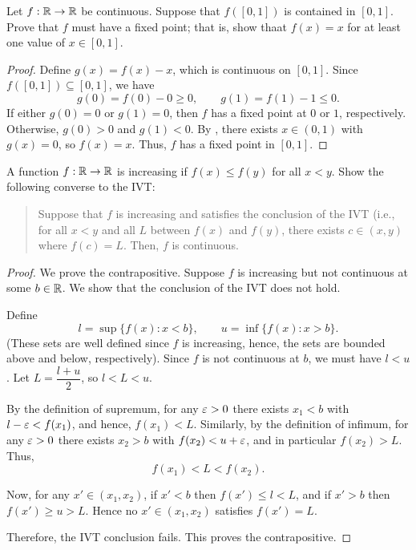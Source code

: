 \begin{problem}
  Let $f : \mathbb{R} \to \mathbb{R}$ be continuous. Suppose that $f([0, 1])$ is contained in $[0, 1]$. Prove that 
  $f$ must have a fixed point; that is, show thaat $f(x) = x$ for at least one value of $x \in [0, 1]$.

  \begin{proof}
    Define $g(x) = f(x) - x$, which is continuous on $[0,1]$.
    Since $f([0,1]) \subseteq [0,1]$, we have
    \[
      g(0) = f(0) - 0 \geq 0, \qquad g(1) = f(1) - 1 \leq 0.
    \]
    If either $g(0) = 0$ or $g(1) = 0$, then $f$ has a fixed point at $0$ or $1$, respectively.
    Otherwise, $g(0) > 0$ and $g(1) < 0$. By ,
    there exists $x \in (0,1)$ with $g(x) = 0$, so $f(x) = x$.
    Thus, $f$ has a fixed point in $[0,1]$.
  \end{proof}
\end{problem}

\begin{problem}
  A function $f : \mathbb{R} \to \mathbb{R}$ is increasing if $f(x) \leq f(y)$ for all $x < y$. Show the following converse to the IVT:

  \begin{quote}
    Suppose that $f$ is increasing and satisfies the conclusion of the IVT
    (i.e., for all $x < y$ and all $L$ between $f(x)$ and $f(y)$, there exists
    $c \in (x, y)$ where $f(c) = L$. Then, $f$ is continuous.
  \end{quote}

  \begin{proof}
    We prove the contrapositive. Suppose $f$ is increasing but not continuous
    at some $b \in \mathbb{R}$. We show that the conclusion of the IVT does not hold.

    Define
    \[
      l = \sup \{ f(x) : x < b \}, \qquad u = \inf \{ f(x) : x > b \}.
    \]
    (These sets are well defined since $f$ is increasing, hence, the sets are
    bounded above and below, respectively).
    Since $f$ is not continuous at $b$, we must have $l<u$.
    Let $L = \dfrac{l+u}{2}$, so $l < L < u$.

    By the definition of supremum, for any $\varepsilon > 0$ there exists
    $x_{1} < b$ with $l - \varepsilon < f(x_{1})$, and hence, $f(x_{1}) < L$.
    Similarly, by the definition of infimum, for any $\varepsilon > 0$ there
    exists $x_{2} > b$ with $f(x_{2}) < u + \varepsilon$, and in particular $f(x_{2})>L$. 
    Thus,
    \[
      f(x_{1}) < L < f(x_{2}).
    \]

    Now, for any $x'\in(x_{1},x_{2})$, if $x' < b$ then $f(x') \leq l < L$, and if
    $x' > b$ then $f(x') \geq u>L$. Hence no $x' \in (x_{1}, x_{2})$ satisfies
    $f(x') = L$.

    Therefore, the IVT conclusion fails. This proves the contrapositive.
  \end{proof}

\end{problem}
